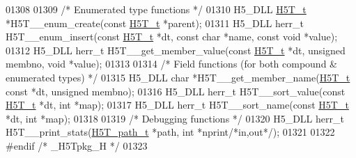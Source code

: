 \begin{DoxyCode}
01308 
01309 \textcolor{comment}{/* Enumerated type functions */}
01310 H5\_DLL \hyperlink{struct_h5_t__t}{H5T\_t} *H5T\_\_enum\_create(\textcolor{keyword}{const} \hyperlink{struct_h5_t__t}{H5T\_t} *parent);
01311 H5\_DLL herr\_t H5T\_\_enum\_insert(\textcolor{keyword}{const} \hyperlink{struct_h5_t__t}{H5T\_t} *dt, \textcolor{keyword}{const} \textcolor{keywordtype}{char} *name, \textcolor{keyword}{const} \textcolor{keywordtype}{void} *value);
01312 H5\_DLL herr\_t H5T\_\_get\_member\_value(\textcolor{keyword}{const} \hyperlink{struct_h5_t__t}{H5T\_t} *dt, \textcolor{keywordtype}{unsigned} membno, \textcolor{keywordtype}{void} *value);
01313 
01314 \textcolor{comment}{/* Field functions (for both compound & enumerated types) */}
01315 H5\_DLL \textcolor{keywordtype}{char}  *H5T\_\_get\_member\_name(\hyperlink{struct_h5_t__t}{H5T\_t} \textcolor{keyword}{const} *dt, \textcolor{keywordtype}{unsigned} membno);
01316 H5\_DLL herr\_t H5T\_\_sort\_value(\textcolor{keyword}{const} \hyperlink{struct_h5_t__t}{H5T\_t} *dt, \textcolor{keywordtype}{int} *map);
01317 H5\_DLL herr\_t H5T\_\_sort\_name(\textcolor{keyword}{const} \hyperlink{struct_h5_t__t}{H5T\_t} *dt, \textcolor{keywordtype}{int} *map);
01318 
01319 \textcolor{comment}{/* Debugging functions */}
01320 H5\_DLL herr\_t H5T\_\_print\_stats(\hyperlink{struct_h5_t__path__t}{H5T\_path\_t} *path, \textcolor{keywordtype}{int} *nprint\textcolor{comment}{/*in,out*/});
01321 
01322 \textcolor{preprocessor}{#endif }\textcolor{comment}{/* \_H5Tpkg\_H */}\textcolor{preprocessor}{}
01323 
\end{DoxyCode}
